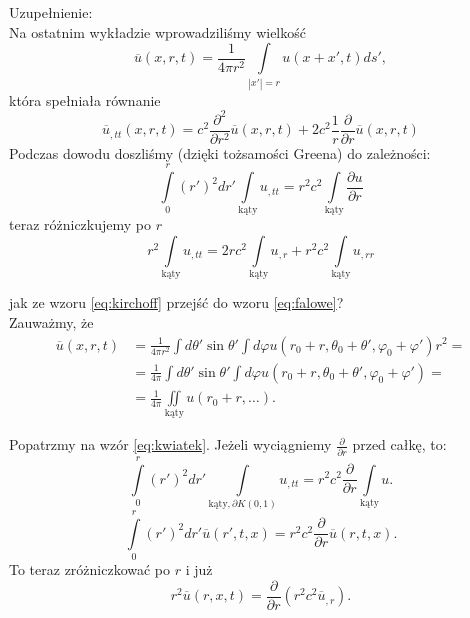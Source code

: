 \documentclass[../main.tex]{subfiles}
\begin{document}
Uzupełnienie:\\
Na ostatnim wykładzie wprowadziliśmy wielkość
\[
		\overline{u} (x,r,t) = \frac{1}{4\pi r^2}\int\limits_{|x'|=r}u(x+x',t)d s'
,\]
która spełniała równanie
\begin{equation}
		\label{eq:falowe}
		\overline{u} _{,t t}(x,r,t) = c^2 \frac{\partial ^2}{\partial r^2} \overline{u} (x,r,t) + 2c^2 \frac{1}{r} \frac{\partial }{\partial r} \overline{u} (x,r,t)
\end{equation}
Podczas dowodu doszliśmy (dzięki tożsamości Greena) do zależności:
\begin{equation}
		\label{eq:kwiatek}
		\int\limits_{0}^{r}\left( r' \right) ^2 dr' \int\limits_{\text{kąty}} u_{,t t} = r^2c^2 \int\limits_{\text{kąty}} \frac{\partial u}{\partial r}
\end{equation}
teraz różniczkujemy po $r$
\begin{equation}
		\label{eq:kirchoff}
		r^2 \int\limits_{\text{kąty}} u_{,t t} = 2 r c^2 \int\limits_{\text{kąty}} u_{,r}+ r^2 c^2 \int\limits_{\text{kąty}} u_{,rr}
\end{equation}
\begin{pytanie}
		jak ze wzoru \ref{eq:kirchoff} przejść do wzoru \ref{eq:falowe}?\\
		Zauważmy, że
		\begin{align*}
				\overline{u} (x,r,t) &= \frac{1}{4\pi r^2} \int d\theta'\sin\theta' \int d\varphi u(r_0+r, \theta_0+\theta', \varphi_0+\varphi')r^2 = \\
				&= \frac{1}{4\pi}\int d\theta' \sin\theta' \int d\varphi u(r_0+r, \theta_0+\theta', \varphi_0+\varphi') = \\
				&= \frac{1}{4\pi}\iint\limits_{\text{kąty}} u(r_0+r,\ldots)
		.\end{align*}
\end{pytanie}
Popatrzmy na wzór \ref{eq:kwiatek}. Jeżeli wyciągniemy $\frac{\partial }{\partial r} $ przed całkę, to:
\[
		\int\limits_0^r \left( r' \right) ^2 dr' \int\limits_{\text{kąty}, \partial K(0,1)}u_{,t t} = r^2 c^2 \frac{\partial }{\partial r} \int\limits_{\text{kąty}}u
.\]
\[
		\int\limits_0^r \left( r' \right) ^2 dr' \overline{u} (r',t,x) = r^2 c^2 \frac{\partial }{\partial r} \overline{u} (r,t,x)
.\]
To teraz zróżniczkować po $r$ i już
\[
		r^2 \overline{u} (r,x,t) = \frac{\partial }{\partial r} \left( r^2c^2 \overline{u} _{,r} \right)
.\]
\end{document}
